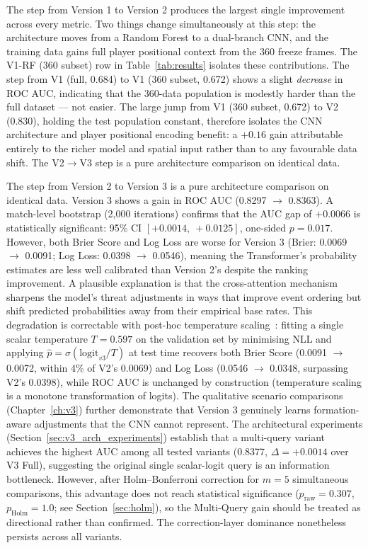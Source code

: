 The step from Version 1 to Version 2 produces the largest single improvement across every metric. Two things change simultaneously at this step: the architecture moves from a Random Forest to a dual-branch CNN, and the training data gains full player positional context from the 360 freeze frames. The V1-RF (360 subset) row in Table~\ref{tab:results} isolates these contributions. The step from V1 (full, 0.684) to V1 (360 subset, 0.672) shows a slight \textit{decrease} in ROC AUC, indicating that the 360-data population is modestly harder than the full dataset — not easier. The large jump from V1 (360 subset, 0.672) to V2 (0.830), holding the test population constant, therefore isolates the CNN architecture and player positional encoding benefit: a $+0.16$ gain attributable entirely to the richer model and spatial input rather than to any favourable data shift. The V2$\to$V3 step is a pure architecture comparison on identical data.

The step from Version 2 to Version 3 is a pure architecture comparison on identical data. Version 3 shows a gain in ROC AUC (0.8297 $\to$ 0.8363). A match-level bootstrap (2,000 iterations) confirms that the AUC gap of $+$0.0066 is statistically significant: 95\% CI $[+0.0014,\ +0.0125]$, one-sided $p = 0.017$. However, both Brier Score and Log Loss are worse for Version 3 (Brier: 0.0069 $\to$ 0.0091; Log Loss: 0.0398 $\to$ 0.0546), meaning the Transformer's probability estimates are less well calibrated than Version 2's despite the ranking improvement. A plausible explanation is that the cross-attention mechanism sharpens the model's threat adjustments in ways that improve event ordering but shift predicted probabilities away from their empirical base rates. This degradation is correctable with post-hoc temperature scaling~\cite{guo2017calibration}: fitting a single scalar temperature $T = 0.597$ on the validation set by minimising NLL and applying $\hat{p} = \sigma(\text{logit}_{v3}/T)$ at test time recovers both Brier Score (0.0091 $\to$ 0.0072, within 4\% of V2's 0.0069) and Log Loss (0.0546 $\to$ 0.0348, surpassing V2's 0.0398), while ROC AUC is unchanged by construction (temperature scaling is a monotone transformation of logits). The qualitative scenario comparisons (Chapter~\ref{ch:v3}) further demonstrate that Version 3 genuinely learns formation-aware adjustments that the CNN cannot represent. The architectural experiments (Section~\ref{sec:v3_arch_experiments}) establish that a multi-query variant achieves the highest AUC among all tested variants (0.8377, $\Delta = +0.0014$ over V3 Full), suggesting the original single scalar-logit query is an information bottleneck. However, after Holm--Bonferroni correction for $m = 5$ simultaneous comparisons, this advantage does not reach statistical significance ($p_{\text{raw}} = 0.307$, $p_{\text{Holm}} = 1.0$; see Section~\ref{sec:holm}), so the Multi-Query gain should be treated as directional rather than confirmed. The correction-layer dominance nonetheless persists across all variants.

